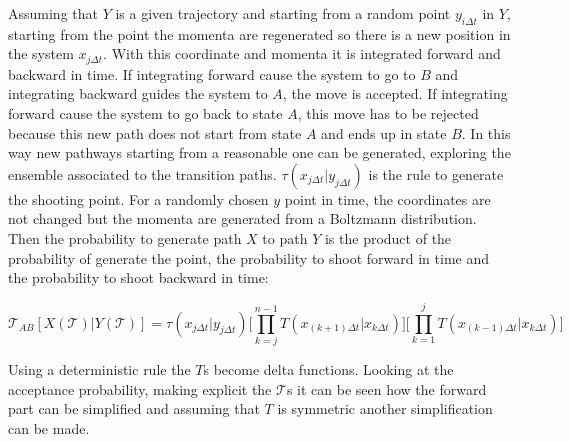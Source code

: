	Assuming that $Y$ is a given trajectory and starting from a random point $y_{i\Delta t}$ in $Y$, starting from the point the momenta are regenerated so there is a new position in the system $x_{j\Delta t}$.
	With this coordinate and momenta it is integrated forward and backward in time.
	If integrating forward cause the system to go to $B$ and integrating backward guides the system to $A$, the move is accepted.
	If integrating forward cause the system to go back to state $A$, this move has to be rejected because this new path does not start from state $A$ and ends up in state $B$.
	In this way new pathways starting from a reasonable one can be generated, exploring the ensemble associated to the transition paths.
	$\tau(x_{j\Delta t}|y_{j\Delta t})$ is the rule to generate the shooting point.
	For a randomly chosen $y$ point in time, the coordinates are not changed but the momenta are generated from a Boltzmann distribution.
	Then the probability to generate path $X$ to path $Y$ is the product of the probability of generate the point, the probability to shoot forward in time and the probability to shoot backward in time:

	$$\mathcal{T}_{AB}[X(\mathcal{T})|Y(\mathcal{T})] = \tau(x_{j\Delta t}|y_{j\Delta t})\biggl[\prod\limits_{k=j}^{n-1}T(x_{(k+1)\Delta t}|x_{k\Delta t})\biggr]\biggl[\prod\limits_{k=1}^jT(x_{(k-1)\Delta t}|x_{k\Delta t})\biggr]$$

	Using a deterministic rule the $T$s become delta functions.
	Looking at the acceptance probability, making explicit the $\mathcal{T}$s it can be seen how the forward part can be simplified and assuming that $T$ is symmetric another simplification can be made.

